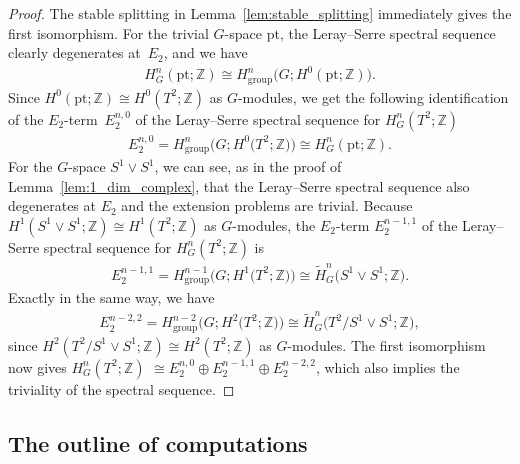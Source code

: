 \documentclass[pdftex]{sigma}
\theoremstyle{definition}
\newcommand{\Z}{\mathbb{Z}}
\newcommand{\pt}{\mathrm{pt}}
\begin{document}
\begin{proof} The stable splitting in Lemma~\ref{lem:stable_splitting} immediately gives the f\/irst isomorphism. For the trivial $G$-space $\pt$, the Leray--Serre spectral sequence clearly degenerates at~$E_2$, and we have
\begin{gather*}
H^n_G(\pt; \Z) \cong H^n_{\mathrm{group}}\big(G; H^0(\pt; \Z)\big).
\end{gather*}
Since $H^0(\pt; \Z) \cong H^0(T^2; \Z)$ as $G$-modules, we get the following identif\/ication of the $E_2$-term~$E_2^{n, 0}$ of the Leray--Serre spectral sequence for $H^n_G(T^2; \Z)$
\begin{gather*}
E_2^{n, 0} = H^n_{\mathrm{group}}\big(G; H^0\big(T^2; \Z\big)\big) \cong H^n_G(\pt; \Z).
\end{gather*}
For the $G$-space $S^1 \vee S^1$, we can see, as in the proof of Lemma~\ref{lem:1_dim_complex}, that the Leray--Serre spectral sequence also degenerates at $E_2$ and the extension problems are trivial. Because $H^1(S^1 \vee S^1; \Z) \cong H^1(T^2; \Z)$ as $G$-modules, the $E_2$-term $E_2^{n-1, 1}$ of the Leray--Serre spectral sequence for $H^n_G(T^2; \Z)$ is
\begin{gather*}
E_2^{n-1, 1} = H^{n-1}_{\mathrm{group}}\big(G; H^1\big(T^2; \Z\big)\big) \cong \tilde{H}^n_G\big(S^1 \vee S^1; \Z\big).
\end{gather*}
Exactly in the same way, we have
\begin{gather*}
E_2^{n-2, 2} = H^{n-2}_{\mathrm{group}}\big(G; H^2\big(T^2; \Z\big)\big) \cong \tilde{H}^n_G\big(T^2/S^1 \vee S^1; \Z\big),
\end{gather*}
since $H^2(T^2/S^1 \vee S^1; \Z) \cong H^2(T^2; \Z)$ as $G$-modules. The f\/irst isomorphism now gives $H^n_G(T^2; \Z)$ $\cong E_2^{n, 0} \oplus E_2^{n-1, 1} \oplus E_2^{n - 2, 2}$, which also implies the triviality of the spectral sequence.
\end{proof}

\subsection{The outline of computations}
\end{document}
